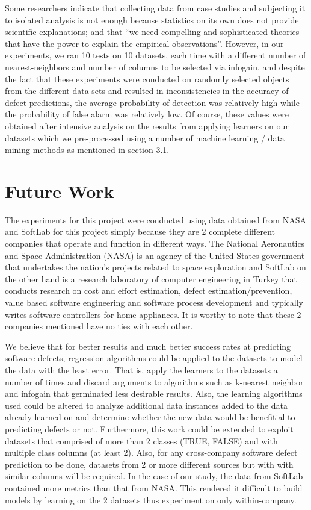 \documentclass{sig-alternate}
\begin{document}
Some researchers indicate that collecting data from case studies and subjecting it to isolated analysis is not enough because statistics on its own does not provide scientific explanations; and that ``we need compelling and sophisticated theories that have the power to explain the empirical observations''\cite{critique}. However, in our experiments, we ran 10 tests on 10 datasets, each time with a different number of nearest-neighbors and number of columns to be selected via infogain, and despite the fact that these experiments were conducted on randomly selected objects from the different data sets and resulted in inconsistencies in the accuracy of defect predictions, the average probability of detection was relatively high while the probability of false alarm was relatively low. Of course, these values were obtained after intensive analysis on the results from applying learners on our datasets which we pre-processed using a number of machine learning / data mining methods as mentioned in section 3.1.


\section{Future Work}
The experiments for this project were conducted using data obtained from NASA and SoftLab for this project simply because they are 2 complete different companies that operate and function in different ways. 
The National Aeronautics and Space Administration (NASA) is an agency of the United States government that undertakes the nation's projects related to space exploration and SoftLab on the other hand is a research laboratory of computer engineering in Turkey that conducts research on cost and effort estimation, defect estimation/prevention, value based software engineering and software process development and typically writes software controllers for home appliances. It is worthy to note that these 2 companies mentioned have no ties with each other. 

We believe that for better results and much better success rates at predicting software defects, regression algorithms could be applied to the datasets to model the data with the least error. That is, apply the learners to the datasets a number of times and discard arguments to algorithms such as k-nearest neighbor and infogain that germinated less desirable results. Also, the learning algorithms used could be altered to analyze additional data instances added to the data already learned on and determine whether the new data would be benefitial to predicting defects or not. Furthermore, this work could be extended to exploit datasets that comprised of more than 2 classes (TRUE, FALSE) and with multiple class columns (at least 2). Also, for any cross-company software defect prediction to be done, datasets from 2 or more different sources but with with similar columns will be required. In the case of our study, the data from SoftLab contained more metrics than that from NASA. This rendered it difficult to build models by learning on the 2 datasets thus experiment on only within-company.
\end{document}
